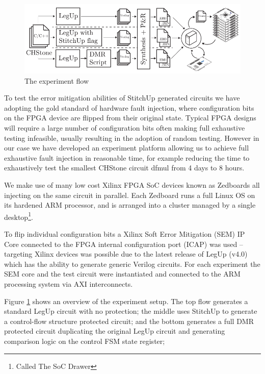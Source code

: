 \begin{figure}[t]
\centering
\includegraphics[width=6in]{./imgs/ExperimentFlow.pdf}
\caption{The experiment flow}
\label{fig:ExperimentFlow}
\end{figure}

To test the error mitigation abilities of StitchUp generated circuits we have adopting the
gold standard of hardware fault injection, where configuration bits on the 
FPGA device are flipped from their original state.
Typical FPGA designs will require a large number of configuration bits often making
full exhaustive testing infeasible, usually resulting in the adoption of random
testing.
However in our case we have developed an experiment
platform allowing us to achieve full exhaustive fault injection in reasonable time,
for example reducing the time to exhaustively test the smallest CHStone circuit dfmul from 4 days
to 8 hours.

We make use of many low cost Xilinx FPGA SoC devices known as
Zedboards all injecting on the same circuit in parallel.
Each Zedboard runs a full Linux OS on its hardened ARM processor, and is arranged into
a cluster managed by a single desktop\footnote{Called The SoC Drawer}.

To flip individual configuration bits a Xilinx Soft Error Mitigation (SEM) IP Core
connected to the FPGA internal configuration port (ICAP) was used --
targeting Xilinx devices was possible due to the latest release of LegUp
(v4.0) which has the ability to generate generic Verilog circuits.
For each experiment the SEM core and the test circuit were instantiated and connected to the
ARM processing system via AXI interconnects.

Figure \ref{fig:ExperimentFlow} shows an overview of the experiment setup.
The top flow generates a standard LegUp circuit with no protection;
the middle uses StitchUp to generate a control-flow structure protected circuit;
and the bottom generates a full DMR protected circuit duplicating the original LegUp
circuit and generating comparison logic on the control FSM state register;

